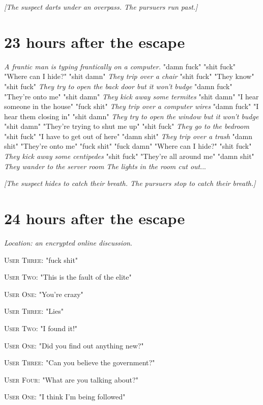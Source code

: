 \documentclass{report}
\begin{document}
\textit{[The suspect darts under an overpass. The pursuers run past.]}


\section*{23 \small{hours after the escape}}

\textit{A frantic man is typing frantically on a computer.} "damn fuck" \textit{} "shit fuck" "Where can I hide?" "shit damn" \textit{They trip over a chair} "shit fuck" "They know" "shit fuck" \textit{They try to open the back door but it won't budge} "damn fuck" "They're onto me" "shit damn" \textit{They kick away some termites} "shit damn" "I hear someone in the house" "fuck shit" \textit{They trip over a computer wires} "damn fuck" "I hear them closing in" "shit damn" \textit{They try to open the window but it won't budge} "shit damn" "They're trying to shut me up" "shit fuck" \textit{They go to the bedroom} "shit fuck" "I have to get out of here" "damn shit" \textit{They trip over a trash} "damn shit" "They're onto me" "fuck shit" \textit{} "fuck damn" "Where can I hide?" "shit fuck" \textit{They kick away some centipedes} "shit fuck" "They're all around me" "damn shit" \textit{They wander to the server room} \textit{The lights in the room cut out}...

\textit{[The suspect hides to catch their breath. The pursuers stop to catch their breath.]}


\section*{24 \small{hours after the escape}}

\textit{Location: an encrypted online discussion}. 

\textsc{User Three}: "fuck shit" 

\textsc{User Two}: "This is the fault of the elite" 

\textsc{User One}: "You're crazy" 

\textsc{User Three}: "Lies" 

\textsc{User Two}: "I found it!" 

\textsc{User One}: "Did you find out anything new?" 

\textsc{User Three}: "Can you believe the government?" 

\textsc{User Four}: "What are you talking about?" 

\textsc{User One}: "I think I'm being followed" 
\end{document}

